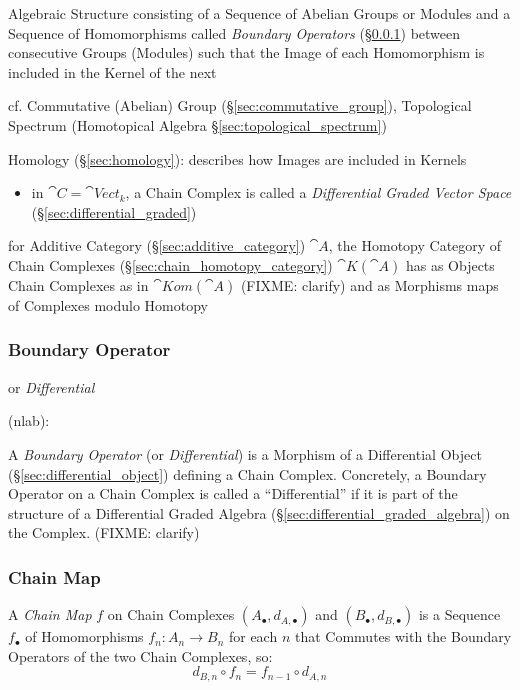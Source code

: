 Algebraic Structure consisting of a Sequence of Abelian Groups or Modules and a
Sequence of Homomorphisms called \emph{Boundary Operators}
(\S\ref{sec:boundary_operator}) between consecutive Groups (Modules) such that
the Image of each Homomorphism is included in the Kernel of the next

\fist cf. Commutative (Abelian) Group (\S\ref{sec:commutative_group}),
Topological Spectrum (Homotopical Algebra \S\ref{sec:topological_spectrum})

\fist Homology (\S\ref{sec:homology}): describes how Images are included in
Kernels

\begin{itemize}
  \item in $\cat{C} = \cat{Vect}_k$, a Chain Complex is called a
    \emph{Differential Graded Vector Space} (\S\ref{sec:differential_graded})
\end{itemize}

\fist for Additive Category (\S\ref{sec:additive_category}) $\cat{A}$, the
Homotopy Category of Chain Complexes (\S\ref{sec:chain_homotopy_category})
$\cat{K}(\cat{A})$ has as Objects Chain Complexes as in $\cat{Kom}(\cat{A})$
(FIXME: clarify) and as Morphisms maps of Complexes modulo Homotopy



\subsubsection{Boundary Operator}\label{sec:boundary_operator}

or \emph{Differential}

(nlab):

A \emph{Boundary Operator} (or \emph{Differential}) is a Morphism of a
Differential Object (\S\ref{sec:differential_object}) defining a Chain Complex.
Concretely, a Boundary Operator on a Chain Complex is called a ``Differential''
if it is part of the structure of a Differential Graded Algebra
(\S\ref{sec:differential_graded_algebra}) on the Complex.
(FIXME: clarify)



\subsubsection{Chain Map}\label{sec:chain_map}

A \emph{Chain Map} $f$ on Chain Complexes $(A_\bullet, d_{A,\bullet})$ and
$(B_\bullet, d_{B,\bullet})$ is a Sequence $f_\bullet$ of Homomorphisms $f_n :
A_n \rightarrow B_n$ for each $n$ that Commutes with the Boundary Operators of
the two Chain Complexes, so:
\[
  d_{B,n} \circ f_n = f_{n-1} \circ d_{A,n}
\]

